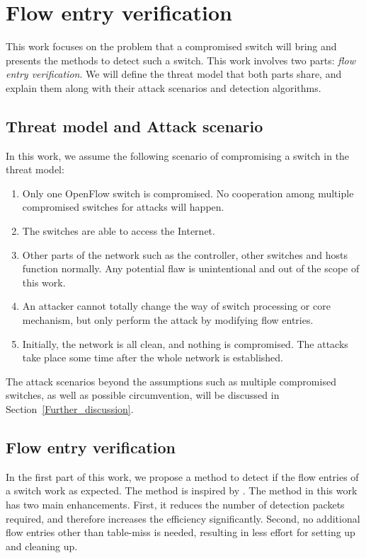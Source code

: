 \chapter{Flow entry verification}
This work focuses on the problem that a compromised switch will bring and presents the methods to detect such a switch. This work involves two parts: \textit{flow entry verification}. We will define the threat model that both parts share, and explain them along with their attack scenarios and detection algorithms.

\section{Threat model and Attack scenario}
In this work, we assume the following scenario of compromising a switch in the threat model:
\begin{enumerate}
\item
Only one OpenFlow switch is compromised. No cooperation among multiple compromised switches for attacks will happen.
\item
The switches are able to access the Internet. 
\item
Other parts of the network such as the controller, other switches and hosts function normally. Any potential flaw is unintentional and out of the scope of this work.
\item
An attacker cannot totally change the way of switch processing or core mechanism, but only perform the attack by modifying flow entries.
\item
Initially, the network is all clean, and nothing is compromised. The attacks take place some time after the whole network is established.
\end{enumerate}

The attack scenarios beyond the assumptions such as multiple compromised switches, as well as possible circumvention, will be discussed in Section~\ref{Further_discussion}.

\section{Flow entry verification}
In the first part of this work, we propose a method to detect if the flow entries of a switch work as expected. The method is inspired by \cite{CKGL15}. The method in this work has two main enhancements. First, it reduces the number of detection packets required, and therefore increases the efficiency significantly. Second, no additional flow entries other than table-miss is needed, resulting in less effort for setting up and cleaning up.

